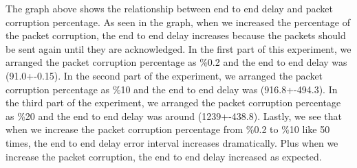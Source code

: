 \documentclass[conference]{IEEEtran}
\begin{document}
The graph above shows the relationship between end to end delay and packet corruption percentage. As seen in the graph, when we increased the percentage of the packet corruption, the end to end delay increases because the packets should be sent again until they are acknowledged. In the first part of this experiment, we arranged the packet corruption percentage as \%0.2 and the end to end delay was (91.0+-0.15). In the second part of the experiment, we arranged the packet corruption percentage as \%10 and the end to end delay was (916.8+-494.3). In the third part of the experiment, we arranged the packet corruption percentage as \%20 and the end to end delay was around (1239+-438.8). Lastly, we see that when we increase the packet corruption percentage from \%0.2 to \%10 like 50 times, the end to end delay error interval increases dramatically. Plus when we increase the packet corruption, the end to end delay increased as expected.
\end{document}
